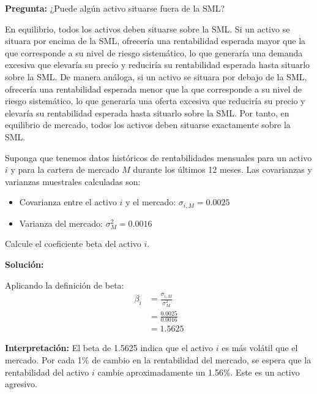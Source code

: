 \textbf{Pregunta:} ¿Puede algún activo situarse fuera de la SML?

En equilibrio, todos los activos deben situarse sobre la SML. Si un activo se situara por encima de la SML, ofrecería una rentabilidad esperada mayor que la que corresponde a su nivel de riesgo sistemático, lo que generaría una demanda excesiva que elevaría su precio y reduciría su rentabilidad esperada hasta situarlo sobre la SML. De manera análoga, si un activo se situara por debajo de la SML, ofrecería una rentabilidad esperada menor que la que corresponde a su nivel de riesgo sistemático, lo que generaría una oferta excesiva que reduciría su precio y elevaría su rentabilidad esperada hasta situarlo sobre la SML. Por tanto, en equilibrio de mercado, todos los activos deben situarse exactamente sobre la SML.

\begin{ejemplo}
Suponga que tenemos datos históricos de rentabilidades mensuales para un activo $i$ y para la cartera de mercado $M$ durante los últimos 12 meses. Las covarianzas y varianzas muestrales calculadas son:
\begin{itemize}
\item Covarianza entre el activo $i$ y el mercado: $\sigma_{i,M} = 0.0025$
\item Varianza del mercado: $\sigma_M^2 = 0.0016$
\end{itemize}

Calcule el coeficiente beta del activo $i$.

\textbf{Solución:}

Aplicando la definición de beta:
\begin{align*}
\beta_i &= \frac{\sigma_{i,M}}{\sigma_M^2} \\
&= \frac{0.0025}{0.0016} \\
&= 1.5625
\end{align*}

\textbf{Interpretación:} El beta de 1.5625 indica que el activo $i$ es más volátil que el mercado. Por cada 1\% de cambio en la rentabilidad del mercado, se espera que la rentabilidad del activo $i$ cambie aproximadamente un 1.56\%. Este es un activo agresivo.
\end{ejemplo}

